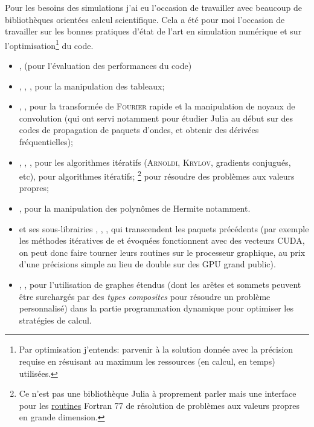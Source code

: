 \documentclass[svgnames,dvipsnames,a4paper,10pt,french]{report}
\begin{document}
Pour les besoins des simulations j'ai eu l'occasion de travailler avec beaucoup de bibliothèques orientées calcul scientifique. Cela a été pour moi l'occasion de travailler sur les bonnes pratiques d'état de l'art en simulation numérique et sur l'optimisation\footnote{Par \og optimisation \fg{} j'entends: parvenir à la solution donnée avec la précision requise en résuisant au maximum les ressources (en calcul, en temps) utilisées.} du code.
\begin{itemize}
    \item {},  (pour l'évaluation des performances du code)
    \item {}, , , pour la manipulation des tableaux;
    \item {}, ,   pour la transformée de \textsc{Fourier} rapide et la manipulation de noyaux de convolution (qui ont servi notamment pour étudier Julia au début sur des codes de propagation de paquets d'ondes, et obtenir des dérivées fréquentielles);
    \item {}, , ,  pour les algorithmes itératifs (\textsc{Arnoldi}, \textsc{Krylov}, gradients conjugués, etc), pour algorithmes itératifs; \footnote{Ce n'est pas une bibliothèque Julia à proprement parler mais une interface pour les \href{https://www.caam.rice.edu/software/ARPACK/}{routines} Fortran 77 de résolution de problèmes aux valeurs propres en grande dimension.} pour résoudre des problèmes aux valeurs propres;
    \item {},  pour la manipulation des polynômes de Hermite notamment.
    \item {} et ses sous-librairies , , , qui transcendent les paquets précédents (par exemple les méthodes itératives de  et   évoquées fonctionnent avec des vecteurs CUDA, on peut donc faire tourner leurs routines sur le processeur graphique, au prix d'une précisions simple au lieu de double sur des GPU grand public).
    \item {},  ,  pour l'utilisation de graphes étendus (dont les arêtes et sommets peuvent être surchargés par des \textit{types composites} pour résoudre un problème personnalisé) dans la partie programmation dynamique pour optimiser les stratégies de calcul.
\end{itemize}
\end{document}
